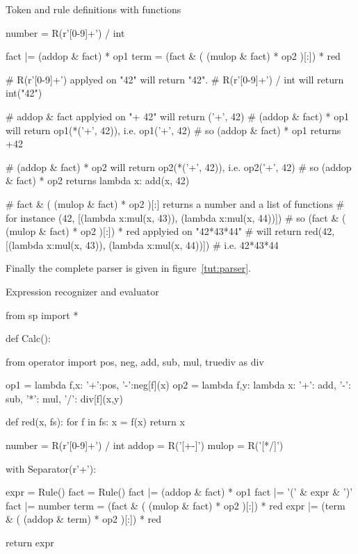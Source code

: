 \begin{code}
\caption{Token and rule definitions with functions}                  \label{tut:tokens}
\begin{verbatimtab}[4]
    number = R(r'[0-9]+') / int

    fact |= (addop & fact) * op1
    term = (fact & ( (mulop & fact) * op2 )[:]) * red

    # R(r'[0-9]+') applyed on "42" will return "42".
    # R(r'[0-9]+') / int will return int("42")

    # addop & fact applyied on "+ 42" will return ('+', 42)
    # (addop & fact) * op1 will return op1(*('+', 42)), i.e. op1('+', 42)
    # so (addop & fact) * op1 returns +42

    # (addop & fact) * op2 will return op2(*('+', 42)), i.e. op2('+', 42)
    # so (addop & fact) * op2 returns lambda x: add(x, 42)

    # fact & ( (mulop & fact) * op2 )[:] returns a number and a list of functions
    # for instance (42, [(lambda x:mul(x, 43)), (lambda x:mul(x, 44))])
    # so (fact & ( (mulop & fact) * op2 )[:]) * red applyied on "42*43*44"
    # will return red(42, [(lambda x:mul(x, 43)), (lambda x:mul(x, 44))])
    # i.e. 42*43*44
\end{verbatimtab}
\end{code}

Finally the complete parser is given in figure~\ref{tut:parser}.

\begin{code}
\caption{Expression recognizer and evaluator}               \label{tut:parser}
\begin{verbatimtab}[4]
from sp import *

def Calc():

    from operator import pos, neg, add, sub, mul, truediv as div

    op1 = lambda f,x: {'+':pos, '-':neg}[f](x)
    op2 = lambda f,y: lambda x: {'+': add, '-': sub, '*': mul, '/': div}[f](x,y)

    def red(x, fs):
        for f in fs: x = f(x)
        return x

    number = R(r'[0-9]+') / int
    addop = R('[+-]')
    mulop = R('[*/]')

    with Separator(r'\s+'):

        expr = Rule()
        fact = Rule()
        fact |= (addop & fact) * op1
        fact |= '(' & expr & ')'
        fact |= number
        term = (fact & ( (mulop & fact) * op2 )[:]) * red
        expr |= (term & ( (addop & term) * op2 )[:]) * red

    return expr
\end{verbatimtab}
\end{code}

